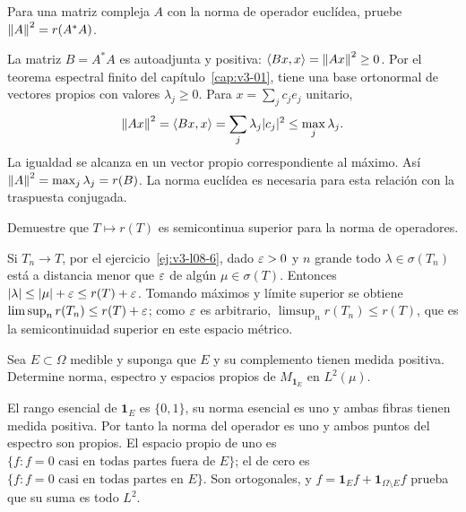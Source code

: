 \begin{ejercicio}\label{ej:v3-l09-3}
Para una matriz compleja $A$ con la norma de operador euclídea, pruebe $\left\lVert A\right\rVert^2=r(A^*A)$.
\end{ejercicio}
\begin{solucion}
La matriz $B=A^*A$ es autoadjunta y positiva: $\left\langle Bx,x\right\rangle=\left\lVert Ax\right\rVert^2\ge0$. Por el teorema espectral finito del capítulo~\ref{cap:v3-01}, tiene una base ortonormal de vectores propios con valores $\lambda_j\ge0$. Para $x=\sum_jc_je_j$ unitario,
\[\left\lVert Ax\right\rVert^2=\left\langle Bx,x\right\rangle=\sum_j\lambda_j|c_j|^2\le\max_j\lambda_j.
\]
La igualdad se alcanza en un vector propio correspondiente al máximo. Así $\left\lVert A\right\rVert^2=\max_j\lambda_j=r(B)$. La norma euclídea es necesaria para esta relación con la traspuesta conjugada.
\end{solucion}

\begin{ejercicio}\label{ej:v3-l09-4}
Demuestre que $T\mapsto r(T)$ es semicontinua superior para la norma de operadores.
\end{ejercicio}
\begin{solucion}
Si $T_n\to T$, por el ejercicio~\ref{ej:v3-l08-6}, dado $\varepsilon>0$ y $n$ grande todo $\lambda\in\sigma(T_n)$ está a distancia menor que $\varepsilon$ de algún $\mu\in\sigma(T)$. Entonces $|\lambda|\le|\mu|+\varepsilon\le r(T)+\varepsilon$. Tomando máximos y límite superior se obtiene $\limsup_n r(T_n)\le r(T)+\varepsilon$; como $\varepsilon$ es arbitrario, $\limsup_n r(T_n)\le r(T)$, que es la semicontinuidad superior en este espacio métrico.
\end{solucion}

\begin{ejercicio}\label{ej:v3-ampl-multiplicador}
Sea $E\subset\Omega$ medible y suponga que $E$ y su complemento tienen medida positiva. Determine norma, espectro y espacios propios de $M_{\boldsymbol1_E}$ en $L^2(\mu)$.
\end{ejercicio}
\begin{solucion}
El rango esencial de $\boldsymbol1_E$ es $\{0,1\}$, su norma esencial es uno y ambas fibras tienen medida positiva. Por tanto la norma del operador es uno y ambos puntos del espectro son propios. El espacio propio de uno es $\{f:f=0\text{ casi en todas partes fuera de }E\}$; el de cero es $\{f:f=0\text{ casi en todas partes en }E\}$. Son ortogonales, y $f=\boldsymbol1_Ef+\boldsymbol1_{\Omega\setminus E}f$ prueba que su suma es todo $L^2$.
\end{solucion}

